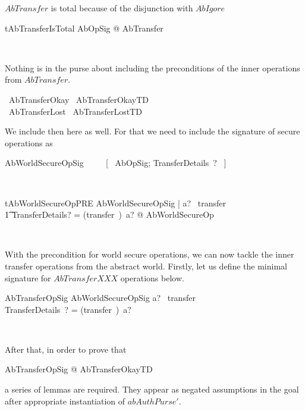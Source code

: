 $AbTransfer$ is total because of the disjunction with $AbIgore$
\begin{LThm}
\begin{theorem}{tAbTransferIsTotal}
   \forall AbOpSig @ \pre AbTransfer
\end{theorem}~\end{LThm}
%
Nothing is in the purse about including the preconditions of the inner
operations from $AbTransfer$.
%
\begin{gzed}
   \pre~AbTransferOkay \land \pre~AbTransferOkayTD \\
   \pre~AbTransferLost \land \pre~AbTransferLostTD
\end{gzed}
%
We include then here as well. For that we need to include the
signature of secure operations as
%
\begin{LNewSDef}
\begin{zed}
   AbWorldSecureOpSig ~~~~ [~ AbOpSig; TransferDetails~? ~]
\end{zed}~\end{LNewSDef}
%
\begin{LNewThm}
\begin{theorem}{tAbWorldSecureOpPRE}
   \forall AbWorldSecureOpSig | a? \in \ran~transfer \land \\
        \t1 \theta TransferDetails? = (transfer~\inv)~a? @ \pre AbWorldSecureOp
\end{theorem}~\end{LNewThm}
%
With the precondition for world secure operations, we can now
tackle the inner transfer operations from the abstract world.
Firstly, let us define the minimal signature for $AbTransferXXX$
operations below.
%
\begin{LNewSDef}
\begin{schema}{AbTransferOpSig}
    AbWorldSecureOpSig
\where
    a? \in \ran~transfer \\
    \theta TransferDetails~? = (transfer~\inv)~a?
\end{schema}~\end{LNewSDef}
%
After that, in order to prove that
%
\begin{gzed}
   \forall AbTransferOpSig @ \pre AbTransferOkayTD
\end{gzed}
%
a series of lemmas are required. They appear as negated assumptions
in the goal after appropriate instantiation of $abAuthPurse'$.
%
